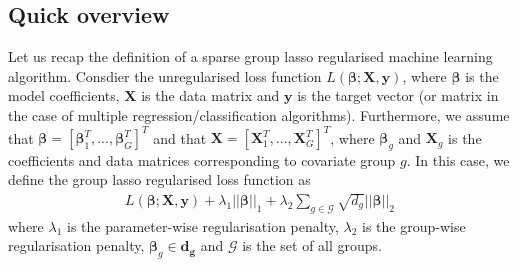 \documentclass[letterpaper,10pt,english]{sphinxmanual}
\begin{document}
\subsection{Quick overview}
\label{\detokenize{maths:quick-overview}}
Let us recap the definition of a sparse group lasso regularised machine
learning algorithm. Consdier the unregularised loss function
\(L(\mathbf{\beta}; \mathbf{X}, \mathbf{y})\), where
\(\mathbf{\beta}\) is the model coefficients, \(\mathbf{X}\) is the
data matrix and \(\mathbf{y}\) is the target vector (or matrix in the
case of multiple regression/classification algorithms). Furthermore, we
assume that
\(\mathbf{\beta} = \left[\mathbf{\beta}_1^T, ..., \mathbf{\beta}_G^T\right]^T\)
and that \(\mathbf{X} = \left[\mathbf{X}_1^T, ..., \mathbf{X}_G^T\right]^T\),
where \(\mathbf{\beta}_g\) and \(\mathbf{X}_g\) is the coefficients
and data matrices corresponding to covariate group \(g\). In this case, we
define the group lasso regularised loss function as
\begin{equation*}
\begin{split}L(\mathbf{\beta}; \mathbf{X}, \mathbf{y})
 + \lambda_1 ||\mathbf{\beta}||_1
 + \lambda_2 \sum_{g \in \mathcal{G}} \sqrt{d_g} ||\mathbf{\beta}||_2\end{split}
\end{equation*}
where \(\lambda_1\) is the parameter-wise regularisation penalty,
\(\lambda_2\) is the group-wise regularisation penalty,
\(\mathbf{\beta}_g \in \mathbf{d_g}\) and
\(\mathcal{G}\) is the set of all groups.
\end{document}
